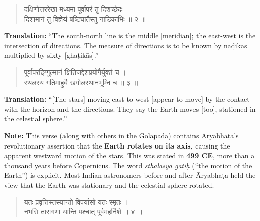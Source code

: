 \documentclass[11pt,a4paper]{article}
\newcommand{\dev}[1]{{\devanagarifont #1}}
\newenvironment{sanskritverse}{\begin{verse}\devanagarifont\large\centering}{\end{verse}}
\begin{document}
\vspace{0.5cm}

\begin{tcolorbox}[colback=white,colframe=rulecolor,title={\dev{\textbf{गोल २ — दिशाज्ञानम् (Directions)}}}]
\begin{sanskritverse}
\dev{दक्षिणोत्तररेखा मध्यमा पूर्वापरं तु दिशच्छेदः ।\\
दिशामानं तु विज्ञेयं षष्टिघातैस्तु नाडिकाभिः ॥ २ ॥}
\end{sanskritverse}
\end{tcolorbox}

\vspace{0.3cm}
\noindent\textbf{Translation:} ``The south-north line is the middle [meridian]; the east-west is the intersection of directions. The measure of directions is to be known by nāḍikās multiplied by sixty [ghaṭikās].''

\vspace{0.5cm}

\begin{tcolorbox}[colback=gray!10,colframe=titlecolor,title={\dev{\textbf{गोल ३ — भूगोलस्य घूर्णनम् (Earth's Rotation) — REVOLUTIONARY VERSE}}}]
\begin{sanskritverse}
\dev{पूर्वापरदिग्गुल्मानं क्षितिजद्देशप्रयोगैर्युक्तं च ।\\
स्थलस्य गतिमाहुर्वै खगोलस्थानभूम्नि च ॥ ३ ॥}
\end{sanskritverse}
\end{tcolorbox}

\vspace{0.3cm}
\noindent\textbf{Translation:} ``[The stars] moving east to west [appear to move] by the contact with the horizon and the directions. They say the Earth moves [too], stationed in the celestial sphere.''

\smallskip
\noindent\textbf{Note:} This verse (along with others in the Golapāda) contains Āryabhaṭa's revolutionary assertion that the \textbf{Earth rotates on its axis}, causing the apparent westward motion of the stars. This was stated in \textbf{499 CE}, more than a thousand years before Copernicus. The word \textit{sthalasya gatiḥ} (``the motion of the Earth'') is explicit. Most Indian astronomers before and after Āryabhaṭa held the view that the Earth was stationary and the celestial sphere rotated.

\vspace{0.5cm}

\begin{tcolorbox}[colback=gray!10,colframe=titlecolor,title={\dev{\textbf{गोल ४ — दिनरात्रिकारणम् (Cause of Day and Night)}}}]
\begin{sanskritverse}
\dev{यतः प्रवृत्तिस्तस्यान्तो विपर्यासो यतः स्मृतः ।\\
नभसि तारागणा यान्ति पश्चात् पूर्वमहर्निशे ॥ ४ ॥}
\end{sanskritverse}
\end{tcolorbox}
\end{document}
